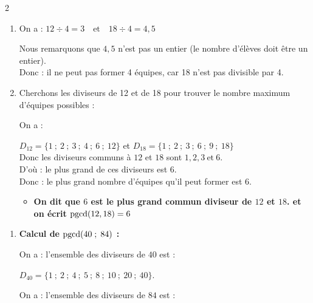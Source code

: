 \documentclass[10pt, a4paper]{article}
\begin{document}
\begin{multicols*}{2}
\begin{Solution}[ACTIVITÉ][5]
\begin{enumerate}[leftmargin=*,itemsep=0.5pt]
    \begin{itemize}[label=$\blacktriangleright$, leftmargin=*, nosep]
    \item \textbf{Ceci montre que 3 est un \textcolor{PrimaryColor}{diviseur commun} à 12 et 18.}
    \end{itemize}

    \item On a : \quad $12 \div 4 = 3   \quad \text{et}  \quad     18 \div 4 = 4,5$

    Nous remarquons que $4,5$ n'est pas un entier (le nombre d'élèves doit être un entier). \\
    Donc : \quad il ne peut pas former 4 équipes, car 18 n'est pas divisible par 4.

    \item Cherchons les diviseurs de 12 et de 18 pour trouver le nombre maximum d'équipes possibles :

    On a :
    
    $D_{12} = \big\{1~;~2~;~3~;~4~;~6~;~12\big\}$ \quad et \quad
    $D_{18} = \big\{1~;~2~;~3~;~6~;~9~;~18\big\}$ \\
    Donc les diviseurs communs à $12$ et $18$ sont $1, 2, 3 ~\text{et}~6$. \\
    D'où : le plus grand de ces diviseurs est $6$. \\
    Donc : le plus grand nombre d'équipes qu'il peut former est $6$.

    \begin{itemize}[label=$\blacktriangleright$, leftmargin=*, nosep]
    \item \textbf{On dit que $6$ est le \textcolor{PrimaryColor}{plus grand commun diviseur}  de $12$ et $18$. et on écrit $\operatorname{pgcd}(12, 18) = 6$}
    \end{itemize}

\end{enumerate}
\end{Solution}

\begin{Solution}[APPLICATION][11]
\begin{enumerate}[leftmargin=*,itemsep=0.5pt]
    \item \textbf{Calcul de $\operatorname{pgcd}(40 \; ; \; 84)$ :}

    On a : l'ensemble des diviseurs de $40$ est :

    $D_{40} = \big\{1~;~2~;~4~;~5~;~8~;~10~;~20~;~40\big\}$.

    On a : l'ensemble des diviseurs de $84$ est :


\end{enumerate}
\end{Solution}
\end{multicols*}
\end{document}
